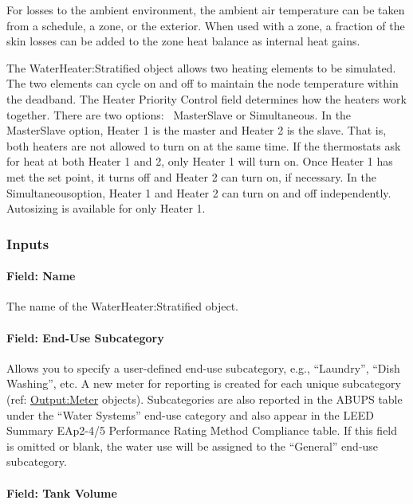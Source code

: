 For losses to the ambient environment, the ambient air temperature can be taken from a schedule, a zone, or the exterior. When used with a zone, a fraction of the skin losses can be added to the zone heat balance as internal heat gains.

The WaterHeater:Stratified object allows two heating elements to be simulated. The two elements can cycle on and off to maintain the node temperature within the deadband. The Heater Priority Control field determines how the heaters work together. There are two options:~ MasterSlave or Simultaneous. In the MasterSlave option, Heater 1 is the master and Heater 2 is the slave. That is, both heaters are not allowed to turn on at the same time. If the thermostats ask for heat at both Heater 1 and 2, only Heater 1 will turn on. Once Heater 1 has met the set point, it turns off and Heater 2 can turn on, if necessary. In the Simultaneousoption, Heater 1 and Heater 2 can turn on and off independently.~ Autosizing is available for only Heater 1.

\subsubsection{Inputs}\label{inputs-1-049}

\paragraph{Field: Name}\label{field-name-1-047}

The name of the WaterHeater:Stratified object.

\paragraph{Field: End-Use Subcategory}\label{field-end-use-subcategory-004}

Allows you to specify a user-defined end-use subcategory, e.g., ``Laundry'', ``Dish Washing'', etc. A new meter for reporting is created for each unique subcategory~ (ref: \hyperref[outputmeter-and-outputmetermeterfileonly]{Output:Meter} objects). Subcategories are also reported in the ABUPS table under the ``Water Systems'' end-use category and also appear in the LEED Summary EAp2-4/5 Performance Rating Method Compliance table. If this field is omitted or blank, the water use will be assigned to the ``General'' end-use subcategory.

\paragraph{Field: Tank Volume}\label{field-tank-volume-1-000}

